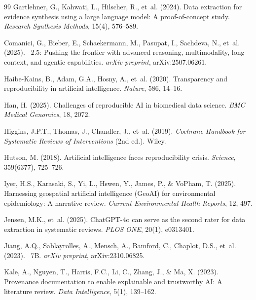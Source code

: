 \documentclass[12pt, a4paper]{article}
\begin{document}
\begin{thebibliography}{99}
Gartlehner, G., Kahwati, L., Hilscher, R., et~al. (2024).
\newblock Data extraction for evidence synthesis using a large language model: A proof-of-concept study.
\newblock \emph{Research Synthesis Methods}, 15(4), 576--589.

Comanici, G., Bieber, E., Schaekermann, M., Pasupat, I., Sachdeva, N., et~al. (2025).
~2.5: Pushing the frontier with advanced reasoning, multimodality, long context, and agentic capabilities.
\newblock \emph{arXiv preprint}, arXiv:2507.06261.

Haibe-Kains, B., Adam, G.A., Hosny, A., et~al. (2020).
\newblock Transparency and reproducibility in artificial intelligence.
\newblock \emph{Nature}, 586, 14--16.

Han, H. (2025).
\newblock Challenges of reproducible AI in biomedical data science.
\newblock \emph{BMC Medical Genomics}, 18, 2072.

Higgins, J.P.T., Thomas, J., Chandler, J., et~al. (2019).
\newblock \emph{Cochrane Handbook for Systematic Reviews of Interventions} (2nd ed.).
\newblock Wiley.

Hutson, M. (2018).
\newblock Artificial intelligence faces reproducibility crisis.
\newblock \emph{Science}, 359(6377), 725--726.

Iyer, H.S., Karasaki, S., Yi, L., Hswen, Y., James, P., \& VoPham, T. (2025).
\newblock Harnessing geospatial artificial intelligence ({GeoAI}) for environmental epidemiology: A narrative review.
\newblock \emph{Current Environmental Health Reports}, 12, 497.

Jensen, M.K., et~al. (2025).
\newblock ChatGPT-4o can serve as the second rater for data extraction in systematic reviews.
\newblock \emph{PLOS ONE}, 20(1), e0313401.

Jiang, A.Q., Sablayrolles, A., Mensch, A., Bamford, C., Chaplot, D.S., et~al. (2023).
~7B.
\newblock \emph{arXiv preprint}, arXiv:2310.06825.

Kale, A., Nguyen, T., Harris, F.C., Li, C., Zhang, J., \& Ma, X. (2023).
\newblock Provenance documentation to enable explainable and trustworthy {AI}: A literature review.
\newblock \emph{Data Intelligence}, 5(1), 139--162.


\end{thebibliography}
\end{document}

